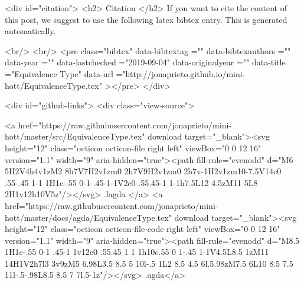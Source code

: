   
  <div id="citation">
  <h2> Citation </h2>
  If you want to cite the content of this post,
  we suggest to use the following latex bibtex entry.
  This is generated automatically.

  <br/>
  <br/>
  <pre class="bibtex"
       data-bibtextag =""
       data-bibtexauthors =""
       data-year =""
       data-lastchecked ="2019-09-04"
       data-originalyear =""
       data-title ="Equivalence Type"
       data-url ="http://jonaprieto.github.io/mini-hott/EquivalenceType.tex"
  ></pre>
  </div>
  

  <div id="github-links">
    <div class="view-source">
      
        <a href="https://raw.githubusercontent.com/jonaprieto/mini-hott/master/src/EquivalenceType.tex" download target="_blank"><svg height="12" class="octicon octicon-file right left" viewBox="0 0 12 16" version="1.1" width="9" aria-hidden="true"><path fill-rule="evenodd" d="M6 5H2V4h4v1zM2 8h7V7H2v1zm0 2h7V9H2v1zm0 2h7v-1H2v1zm10-7.5V14c0 .55-.45 1-1 1H1c-.55 0-1-.45-1-1V2c0-.55.45-1 1-1h7.5L12 4.5zM11 5L8 2H1v12h10V5z"/></svg> .lagda </a>
        <a href="https://raw.githubusercontent.com/jonaprieto/mini-hott/master/docs/agda/EquivalenceType.tex" download target="_blank"><svg height="12" class="octicon octicon-file-code right left" viewBox="0 0 12 16" version="1.1" width="9" aria-hidden="true"><path fill-rule="evenodd" d="M8.5 1H1c-.55 0-1 .45-1 1v12c0 .55.45 1 1 1h10c.55 0 1-.45 1-1V4.5L8.5 1zM11 14H1V2h7l3 3v9zM5 6.98L3.5 8.5 5 10l-.5 1L2 8.5 4.5 6l.5.98zM7.5 6L10 8.5 7.5 11l-.5-.98L8.5 8.5 7 7l.5-1z"/></svg> .agda</a>
      
